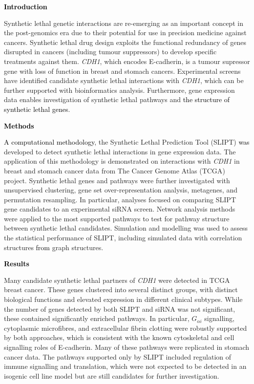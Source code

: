 \textbf{\textcolor{black}{Introduction}}

Synthetic lethal genetic interactions are re-emerging as an important concept in the post-genomics era due to their potential for use in precision medicine against cancers. Synthetic lethal drug design exploits the functional redundancy of genes disrupted in cancers (including tumour suppressors) to develop specific treatments against them. \textit{CDH1}, which encodes \gls{E-cadherin}, is a tumour supressor gene with loss of function in breast and stomach cancers. Experimental screens have identified candidate synthetic lethal interactions with \textit{CDH1}, which can be further supported with bioinformatics analysis. Furthermore, gene expression data enables investigation of synthetic lethal pathways and \textcolor{black}{the structure of synthetic lethal genes}. 

\textbf{\textcolor{black}{Methods}}

\textcolor{black}{A computational methodology}, the Synthetic Lethal Prediction Tool (\acrshort{SLIPT}) \textcolor{black}{was} developed to detect synthetic lethal interactions in gene expression data. The application of this methodology is demonstrated on interactions with \textit{CDH1} in breast and stomach cancer data from The Cancer Genome Atlas (\acrshort{TCGA}) project. Synthetic lethal genes and pathways were further investigated with unsupervised clustering, gene set over-representation analysis, metagenes, and permutation resampling. In particular, analyses focused on comparing \acrshort{SLIPT} gene candidates to an experimental \acrfull{siRNA} screen. 
Network analysis methods were applied to the most supported pathways to test for pathway structure between synthetic lethal candidates. Simulation and modelling was used to assess the statistical performance of \acrshort{SLIPT}, including simulated data with correlation structures \textcolor{black}{from} graph structures.

\textbf{\textcolor{black}{Results}}

Many candidate synthetic lethal partners of \textit{CDH1} were detected in \acrshort{TCGA} breast cancer. These genes clustered into several distinct groups, with distinct biological functions and elevated expression in different clinical subtypes. While the number of genes detected by both \acrshort{SLIPT} and \acrshort{siRNA} was not significant, these contained significantly enriched pathways. In particular, $G_{\alpha i}$ signalling, cytoplasmic microfibres, and extracellular fibrin clotting were robustly supported by both approaches, which is consistent with the known cytoskeletal and cell signalling roles of \gls{E-cadherin}. Many of these pathways were replicated in stomach cancer data. The pathways supported only by \acrshort{SLIPT} included regulation of immune signalling and translation, which were not expected to be detected in an isogenic cell line model but are still candidates for further investigation. 

